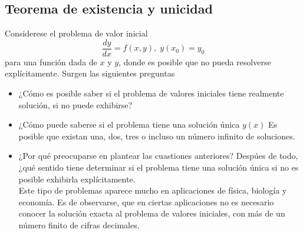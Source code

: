 \documentclass[10pt,a4paper,notitlepage]{report}
\begin{document}
\begin{itemize}
\section{Teorema de existencia y unicidad}
\Large
Considerese el problema de valor inicial
\begin{equation}
\frac{dy}{dx} = f(x, y), \; y(x_{0}) = y_{0}
\end{equation}
para una función dada de $x$ y $y$, donde es posible que no pueda resolverse explícitamente. Surgen las siguientes preguntas
\begin{itemize}
\item ¿Cómo es posible saber si el problema de valores iniciales tiene realmente solución, si no puede exhibirse?
\item ¿Cómo puede saberse si el problema tiene una solución única $y(x)$ Es posible que existan una, dos, tres o incluso un número infinito de soluciones.
\item ¿Por qué preocuparse en plantear las cuastiones anteriores? Despúes de todo, ¿qué sentido tiene determinar si el problema tiene una solución única si no es posible exhibirla explícitamente. \\
Este tipo de problemas aparece mucho en aplicaciones de física, biología y economía. Es de observarse, que en ciertas aplicaciones no es necesario conocer la solución exacta al problema de valores iniciales, con más de un número finito de cifras decimales.
\end{itemize}

\end{itemize}
\end{document}
